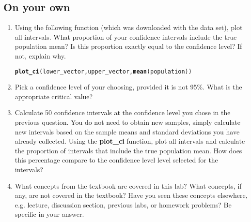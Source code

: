 \documentclass{article}\usepackage[]{graphicx}\usepackage[]{color}
\makeatletter
\newcommand{\hlstd}[1]{\textcolor[rgb]{0.345,0.345,0.345}{#1}}%
\newcommand{\hlkwd}[1]{\textcolor[rgb]{0.737,0.353,0.396}{\textbf{#1}}}%
\newenvironment{kframe}{%
 \def\at@end@of@kframe{}%
 \ifinner\ifhmode%
  \def\at@end@of@kframe{\end{minipage}}%
  \begin{minipage}{\columnwidth}%
 \fi\fi%
 \def\FrameCommand##1{\hskip\@totalleftmargin \hskip-\fboxsep
 \colorbox{shadecolor}{##1}\hskip-\fboxsep
     \hskip-\linewidth \hskip-\@totalleftmargin \hskip\columnwidth}%
 \MakeFramed {\advance\hsize-\width
   \@totalleftmargin\z@ \linewidth\hsize
   \@setminipage}}%
 {\par\unskip\endMakeFramed%
 \at@end@of@kframe}
\newenvironment{knitrout}{}{} %
\makeatother
\begin{document}
\subsection*{On your own}

\begin{enumerate}

\item Using the following function (which was downloaded with the data set), plot all intervals. What proportion of your confidence intervals include the true population mean? Is this proportion exactly equal to the confidence level? If not, explain why.

\begin{knitrout}
\color{fgcolor}\begin{kframe}
\begin{alltt}
\hlkwd{plot_ci}\hlstd{(lower_vector, upper_vector,} \hlkwd{mean}\hlstd{(population))}
\end{alltt}
\end{kframe}
\end{knitrout}


\item Pick a confidence level of your choosing, provided it is not 95\%. What is the appropriate critical value?

\item Calculate 50 confidence intervals at the confidence level you chose in the previous question. You do not need to obtain new samples, simply calculate new intervals based on the sample means and standard deviations you have already collected. Using the \hlkwd{plot\_ci} function, plot all intervals and calculate the proportion of intervals that include the true population mean. How does this percentage compare to the confidence level level selected for the intervals?

\item What concepts from the textbook are covered in this lab?  What concepts, if any, are not covered in the textbook?  Have you seen these concepts elsewhere, e.g. lecture, discussion section, previous labs, or homework problems?  Be specific in your answer.

\end{enumerate}
  
  
\end{document}
